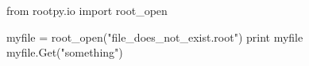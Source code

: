 \begin{footnotesize}
\begin{pyglist}[language=python,texcl=true,abovecaptionskip=0,style=vs,bgcolor=Moccasin]
from rootpy.io import root_open

myfile = root_open("file_does_not_exist.root")
print myfile
myfile.Get("something")
\end{pyglist}
\end{footnotesize}
